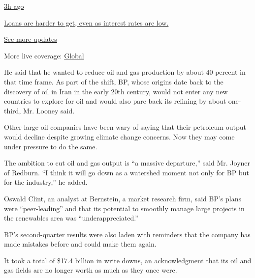 \href{https://www.nytimes.com/live/2020/08/04/business/stock-market-today-coronavirus?action=click\&pgtype=Article\&state=default\&region=MAIN_CONTENT_1\&context=storylines_live_updates\#loans-are-harder-to-get-even-as-interest-rates-are-low}{3h
ago}

\href{https://www.nytimes.com/live/2020/08/04/business/stock-market-today-coronavirus?action=click\&pgtype=Article\&state=default\&region=MAIN_CONTENT_1\&context=storylines_live_updates\#loans-are-harder-to-get-even-as-interest-rates-are-low}{Loans
are harder to get, even as interest rates are low.}

\href{https://www.nytimes.com/live/2020/08/04/business/stock-market-today-coronavirus?action=click\&pgtype=Article\&state=default\&region=MAIN_CONTENT_1\&context=storylines_live_updates}{See
more updates}

More live coverage:
\href{https://www.nytimes.com/2020/08/04/world/coronavirus-cases.html?action=click\&pgtype=Article\&state=default\&region=MAIN_CONTENT_1\&context=storylines_live_updates}{Global}

He said that he wanted to reduce oil and gas production by about 40
percent in that time frame. As part of the shift, BP, whose origins date
back to the discovery of oil in Iran in the early 20th century, would
not enter any new countries to explore for oil and would also pare back
its refining by about one-third, Mr. Looney said.

Other large oil companies have been wary of saying that their petroleum
output would decline despite growing climate change concerns. Now they
may come under pressure to do the same.

The ambition to cut oil and gas output is ``a massive departure,'' said
Mr. Joyner of Redburn. ``I think it will go down as a watershed moment
not only for BP but for the industry,'' he added.

Oswald Clint, an analyst at Bernstein, a market research firm, said BP's
plans were ``peer-leading'' and that its potential to smoothly manage
large projects in the renewables area was ``underappreciated.''

BP's second-quarter results were also laden with reminders that the
company has made mistakes before and could make them again.

It took
\href{https://www.nytimes.com/2020/06/15/business/energy-environment/bp-oil-gas-write-down.html}{a
total of \$17.4 billion in write downs}, an acknowledgment that its oil
and gas fields are no longer worth as much as they once were.

